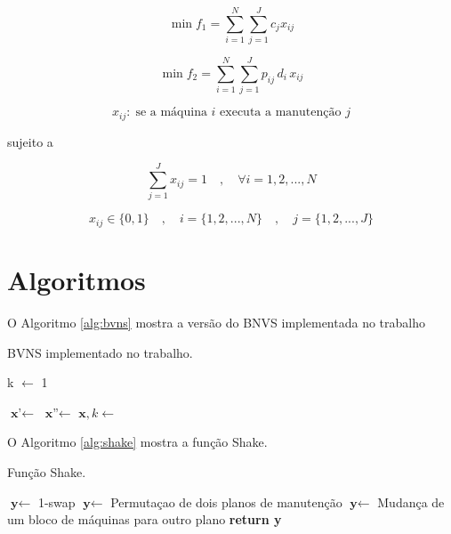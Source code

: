 \documentclass[
	12pt,				%
	oneside,			%
	a4paper,			%
	chapter=TITLE,
	sumario=tradicional,
	english,			%
	brazil				%
]{abntex2}
\newcommand{\un}[1]{\;\text{#1}}
\begin{document}
\[  \min f_1 = \sum_{i=1}^{N} \sum_{j=1}^{J} c_j x_{ij} \]

\[  \min f_2 = \sum_{i=1}^{N} \sum_{j=1}^{J} p_{ij} \, d_i \, x_{ij} \]

\[  x_{ij}: \un{se a máquina $i$ executa a manutenção $j$}  \]


\noindent sujeito a

\[ \sum_{j=1}^{J} x_{ij} = 1 \quad , \quad \forall i = {1, 2, ..., N} \]

\[ x_{ij} \in \{0,1\} \quad , \quad i = \{1, 2, ..., N\}  \quad , \quad j = \{1, 2, ..., J\} \]



\chapter{Algoritmos}\label{cap:algoritmos} 

O Algoritmo \ref{alg:bvns} mostra a versão do BNVS implementada 
no trabalho

\begin{algorithm}[H]
	\caption{BVNS implementado no trabalho.}\label{alg:bvns}
	\begin{algorithmic}[1]
			\State k $\gets$ 1

				\State $ \textbf{x'} \gets$  
				\State $ \textbf{x''} \gets$  
				\State $ \textbf{x}, k \gets$  
			\EndWhile
		\EndWhile
	\EndProcedure 
	\end{algorithmic}
\end{algorithm}

O Algoritmo \ref{alg:shake} mostra a função Shake.

\begin{algorithm}[H]
	\caption{Função Shake.}\label{alg:shake}
	\begin{algorithmic}[1]
			\State $\textbf{y} \gets$ 1-swap
		\EndIf
			\State $\textbf{y} \gets$ Permutaçao de dois planos de manutenção
		\EndIf
			\State $\textbf{y} \gets$ Mudança de um bloco de máquinas para outro plano
		\EndIf
	\Statex
	\State \textbf{return y} 

	\EndProcedure 
	\end{algorithmic}
\end{algorithm}
\end{document}
